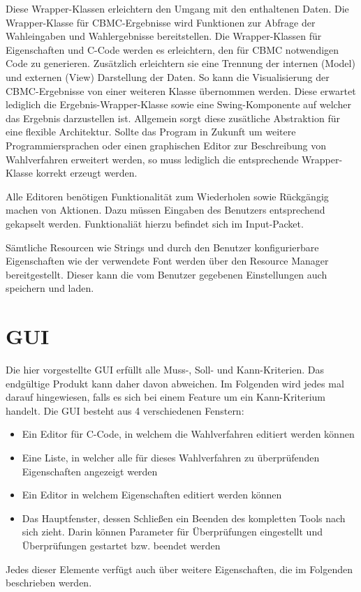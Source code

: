 \documentclass[a4paper]{scrreprt}
\begin{document}
Diese Wrapper-Klassen erleichtern den Umgang mit den enthaltenen Daten. Die Wrapper-Klasse für CBMC-Ergebnisse wird Funktionen zur Abfrage der Wahleingaben und Wahlergebnisse bereitstellen. Die Wrapper-Klassen für Eigenschaften und C-Code werden es erleichtern, den für CBMC notwendigen Code zu generieren. Zusätzlich erleichtern sie eine Trennung der internen (Model) und externen (View) Darstellung der Daten. So kann die Visualisierung der CBMC-Ergebnisse von einer weiteren Klasse übernommen werden. Diese erwartet lediglich die Ergebnis-Wrapper-Klasse sowie eine Swing-Komponente auf welcher das Ergebnis darzustellen ist. Allgemein sorgt diese zusätliche  Abstraktion für eine flexible Architektur. Sollte das Program in Zukunft um weitere Programmiersprachen oder einen graphischen Editor zur Beschreibung von Wahlverfahren erweitert werden, so muss lediglich die entsprechende Wrapper-Klasse korrekt erzeugt werden.

Alle Editoren benötigen Funktionalität zum Wiederholen sowie Rückgängig machen von Aktionen. Dazu müssen Eingaben des Benutzers entsprechend gekapselt werden. Funktionaliät hierzu befindet sich im Input-Packet.

Sämtliche Resourcen wie Strings und durch den Benutzer konfigurierbare Eigenschaften wie der verwendete Font werden über den Resource Manager bereitgestellt. Dieser kann die vom Benutzer gegebenen Einstellungen auch speichern und laden.

\chapter{GUI}
Die hier vorgestellte \ac{GUI} erfüllt alle Muss-, Soll- und Kann-Kriterien. Das endgültige Produkt kann daher davon abweichen. Im Folgenden wird jedes mal darauf hingewiesen, falls es sich bei einem Feature um ein Kann-Kriterium handelt.
Die \ac{GUI} besteht aus 4 verschiedenen Fenstern: 
\begin{itemize}
\item Ein Editor für C-Code, in welchem die Wahlverfahren editiert werden können
\item Eine Liste, in welcher alle für dieses Wahlverfahren zu überprüfenden Eigenschaften angezeigt werden
\item Ein Editor in welchem Eigenschaften editiert werden können
\item Das Hauptfenster, dessen Schließen ein Beenden des kompletten Tools nach sich zieht. Darin können Parameter für Überprüfungen eingestellt und Überprüfungen gestartet bzw. beendet werden
\end{itemize}
Jedes dieser Elemente verfügt auch über weitere Eigenschaften, die im Folgenden beschrieben werden.
\end{document}
